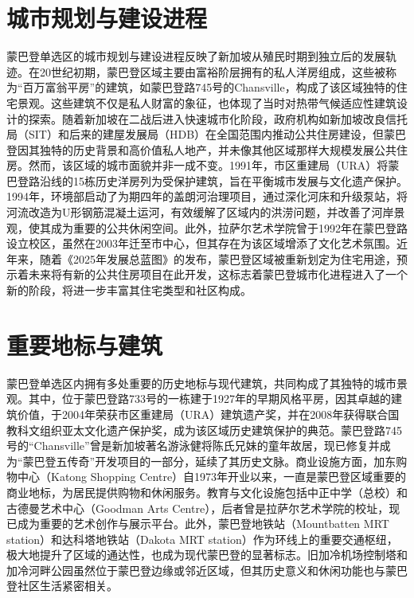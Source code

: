 \documentclass[11pt,a4paper,twoside,openany]{book}
\begin{document}
\section{城市规划与建设进程}
蒙巴登单选区的城市规划与建设进程反映了新加坡从殖民时期到独立后的发展轨迹。在20世纪初期，蒙巴登区域主要由富裕阶层拥有的私人洋房组成，这些被称为“百万富翁平房”的建筑，如蒙巴登路745号的Chansville，构成了该区域独特的住宅景观。这些建筑不仅是私人财富的象征，也体现了当时对热带气候适应性建筑设计的探索。随着新加坡在二战后进入快速城市化阶段，政府机构如新加坡改良信托局（SIT）和后来的建屋发展局（HDB）在全国范围内推动公共住房建设，但蒙巴登因其独特的历史背景和高价值私人地产，并未像其他区域那样大规模发展公共住房。然而，该区域的城市面貌并非一成不变。1991年，市区重建局（URA）将蒙巴登路沿线的15栋历史洋房列为受保护建筑，旨在平衡城市发展与文化遗产保护。1994年，环境部启动了为期四年的盖朗河治理项目，通过深化河床和升级泵站，将河流改造为U形钢筋混凝土运河，有效缓解了区域内的洪涝问题，并改善了河岸景观，使其成为重要的公共休闲空间。此外，拉萨尔艺术学院曾于1992年在蒙巴登路设立校区，虽然在2003年迁至市中心，但其存在为该区域增添了文化艺术氛围。近年来，随着《2025年发展总蓝图》的发布，蒙巴登区域被重新划定为住宅用途，预示着未来将有新的公共住房项目在此开发，这标志着蒙巴登城市化进程进入了一个新的阶段，将进一步丰富其住宅类型和社区构成。

\section{重要地标与建筑}
蒙巴登单选区内拥有多处重要的历史地标与现代建筑，共同构成了其独特的城市景观。其中，位于蒙巴登路733号的一栋建于1927年的早期风格平房，因其卓越的建筑价值，于2004年荣获市区重建局（URA）建筑遗产奖，并在2008年获得联合国教科文组织亚太文化遗产保护奖，成为该区域历史建筑保护的典范。蒙巴登路745号的“Chansville”曾是新加坡著名游泳健将陈氏兄妹的童年故居，现已修复并成为“蒙巴登五传奇”开发项目的一部分，延续了其历史文脉。商业设施方面，加东购物中心（Katong Shopping Centre）自1973年开业以来，一直是蒙巴登区域重要的商业地标，为居民提供购物和休闲服务。教育与文化设施包括中正中学（总校）和古德曼艺术中心（Goodman Arts Centre），后者曾是拉萨尔艺术学院的校址，现已成为重要的艺术创作与展示平台。此外，蒙巴登地铁站（Mountbatten MRT station）和达科塔地铁站（Dakota MRT station）作为环线上的重要交通枢纽，极大地提升了区域的通达性，也成为现代蒙巴登的显著标志。旧加冷机场控制塔和加冷河畔公园虽然位于蒙巴登边缘或邻近区域，但其历史意义和休闲功能也与蒙巴登社区生活紧密相关。
\end{document}
